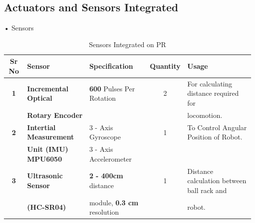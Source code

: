     \subsection{Actuators and Sensors Integrated}
            • Sensors
            \begin{table}[h]
                \caption {Sensors Integrated on PR} \label{Sensors_PR}  \small
                \begin{tabular}{|c|l|l|c|l|}
                    \hline  \hline
                    \textbf{Sr No}  & \textbf{Sensor}                   & \textbf{Specification}                & \textbf{Quantity} & \textbf{Usage}                                      \\ \hline   \hline
                    \textbf{1}      & \textbf{Incremental Optical}      & \textbf{600} Pulses Per Rotation      &        2          & For calculating distance required for               \\
                                    & \textbf{Rotary Encoder}           &                                       &                   & locomotion.                                         \\ \hline         
                    \textbf{2}      & \textbf{Intertial Measurement}    & 3 - Axis Gyroscope                    &        1          & To Control Angular Position of  Robot.              \\ 
                                    & \textbf{Unit (IMU) MPU6050}       & 3 - Axis Accelerometer                &                   &                                                     \\ \hline                                     
                    \textbf{3}      & \textbf{Ultrasonic Sensor}        & \textbf{2 - 400cm} distance           &        1          & Distance calculation between ball rack and          \\ 
                                    & \textbf{(HC-SR04)}                & module, \textbf{0.3 cm} resolution    &                   & robot.                                              \\ \hline   \hline
                \end{tabular}
            \end{table}
